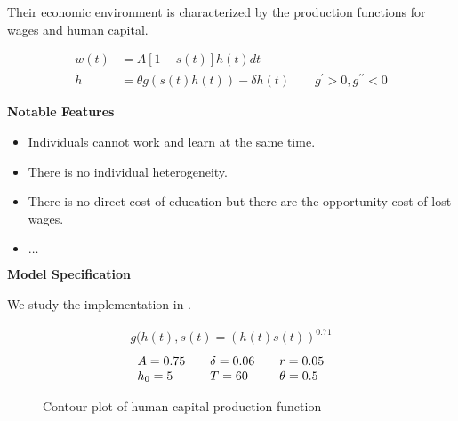 \begin{frame}
Their economic environment is characterized by the production functions for wages and human capital.

\begin{align*}
w(t)    & = A[1 - s(t)]h(t)dt \\
\dot{h} & = \theta g(s(t) h(t)) - \delta h(t) \qquad g^\prime > 0, g^{\prime\prime} < 0
\end{align*}

\end{frame}
\begin{frame}\textbf{Notable Features}\vspace{0.3cm}

\begin{itemize}\setlength\itemsep{1em}
\item Individuals cannot work and learn at the same time.
\item There is no individual heterogeneity.
\item There is no direct cost of education but there are the opportunity cost of lost wages.
\item $\hdots$
\end{itemize}

\end{frame}
\begin{frame}\textbf{Model Specification}\vspace{0.3cm}

We study the implementation in .

\begin{align*}
	g(h(t), s(t) = \left(h(t) s(t)\right)^{0.71}
\end{align*}\vspace{-1.0cm}
\begin{align*}\begin{array}{l@{\qquad}l@{\qquad}l}
	A = 0.75 & \delta = 0.06 & r = 0.05\\
	h_0 = 5 & T = 60 & \theta = 0.5
\end{array}\end{align*}
\end{frame}

\begin{frame}\begin{figure}[htp]\centering
\caption{Contour plot of human capital production function}
\end{figure}\end{frame}

